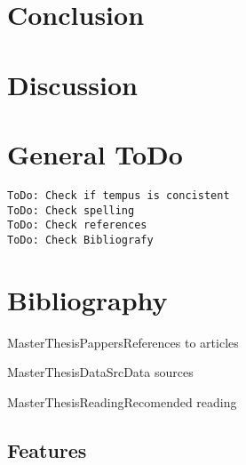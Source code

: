 \documentclass[a4paper,11pt]{kth-mag}
\begin{document}
\section{Conclusion}




\section{Discussion}



\section{General ToDo}
\texttt{ToDo: Check if tempus is concistent} \\
\texttt{ToDo: Check spelling} \\
\texttt{ToDo: Check references} \\
\texttt{ToDo: Check Bibliografy} \\



\pagebreak
\section{Bibliography}
{MasterThesisPappers}{References to articles} 

{MasterThesisDataSrc}{Data sources} 

{MasterThesisReading}{Recomended reading} 

\pagebreak
\begin{appendices}

\section{Features} \label{sss:appendix_a}


\end{appendices}
\end{document}
